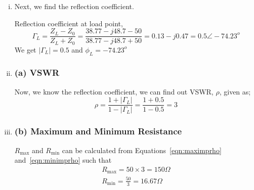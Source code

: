 \begin{exmp}
\begin{enumerate}[(i)]
\item Next, we find the reflection coefficient.

Reflection coefficient at load point,
\begin{dmath*}
\Gamma_{L}=\frac{Z_{L}-Z_{0}}{Z_{L}+Z_{0}}
= \frac{38.77-j48.7-50}{38.77-j48.7+50}
=0.13-j0.47 = 0.5\angle-74.23^o
\end{dmath*}
We get $|\Gamma_{L}|=0.5$ and $\phi_L = -74.23^o$

\item 
\subsubsection*{(a) VSWR}
Now, we know the reflection coefficient, we can find out VSWR, $\rho$, given as;
\begin{dmath*}
\rho=\frac{1 + |\Gamma_{L}|}{1-|\Gamma_{L}|}=\frac{1+0.5}{1-0.5} = 3
\end{dmath*}

\item 
\subsubsection*{(b) Maximum and Minimum Resistance}
$R_\max$ and $R_\min$ can be calculated from Equations~\eqref{eqn:maximprho} and~\eqref{eqn:minimprho} such that
\begin{align*}
R_\max = 50 \times 3 = 150\Omega\\
R_\min = \frac{50}{3} = 16.67\Omega
\end{align*}
\end{enumerate}
\end{exmp}


